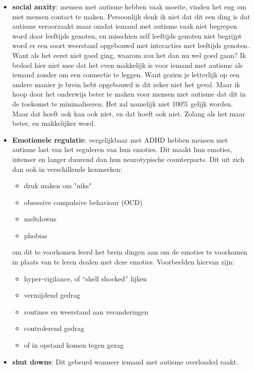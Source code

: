 \documentclass{article}
\begin{document}
                    \begin{itemize}
                        \item \textbf{social anxity}: 
                            mensen met autisme hebben vaak moeite, vinden het eng om met mensen contact te maken. Persoonlijk denk ik niet dat dit een ding is dat autisme veroorzaakt maar omdat iemand met autisme vaak niet begrepen word door leeftijds genoten, en misschien zelf leeftijds genoten niet begrijpt word er een soort weerstand opgebouwd met interacties met leeftijds genoten. Want als het eerst niet goed ging, waarom zou het dan nu wel goed gaan?
                            \smallskip
                            Ik bedoel hier niet mee dat het even makkelijk is voor iemand met autisme als iemand zonder om een connectie te leggen. Want gezien je letterlijk op een andere manier je brein hebt opgebouwd is dit zeker niet het geval. Maar ik hoop door het onderwijs beter te maken voor mensen met autisme dat dit in de toekomst te minimaliseren. Het zal namelijk niet 100\% gelijk worden. Maar dat hoeft ook kan ook niet, en dat hoeft ook niet. Zolang als het maar beter, en makkelijker word.
                        \item \textbf{Emotionele regulatie}: 
                            vergelijkbaar met ADHD hebben mensen met autisme last van het reguleren van hun emoties. Dit maakt hun emoties, intenser en langer duurend dan hun neurotypische counterparts. Dit uit zich dan ook in verschillende kenmerken:
                            \begin{itemize}
                                \item druk maken om "niks"
                                \item obsessive compulsive behaviour (OCD)
                                \item meltdowns
                                \item phobias
                            \end{itemize}
                            om dit te voorkomen leerd het brein dingen aan om de emoties te voorkomen in plaats van te leren dealen met deze emoties. Voorbeelden hiervan zijn:
                            \begin{itemize}
                                \item hyper-vigilance, of “shell shocked” lijken
                                \item vermijdend gedrag
                                \item routines en weerstand aan veranderingen
                                \item controlerend gedrag
                                \item of in opstand komen tegen gezag
                            \end{itemize}
                        \item \textbf{shut downs}\cite{autisme-shutdowns}: Dit gebeurd wanneer iemand met autisme overloaded raakt.
                    \end{itemize}
\end{document}
